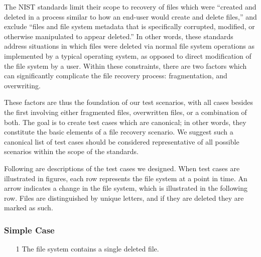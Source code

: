 The NIST standards limit their scope to recovery of files which were ``created and deleted in a process similar to how an end-user would create and delete files,''\cite{meta:dfr:standards} and exclude ``files and file system metadata that is specifically corrupted, modified, or otherwise manipulated to appear deleted.''\cite{meta:dfr:standards}
In other words, these standards address situations in which files were deleted via normal file system operations as implemented by a typical operating system, as opposed to direct modification of the file system by a user.
Within these constraints, there are two factors which can significantly complicate the file recovery process: 
fragmentation, and overwriting. 

These factors are thus the foundation of our test scenarios, with all cases besides the first involving either fragmented files, overwritten files, or a combination of both. 
The goal is to create test cases which are canonical; in other words, they constitute the basic elements of a file recovery scenario.
We suggest such a canonical list of test cases should be considered representative of all possible scenarios within the scope of the standards.

Following are descriptions of the test cases we designed. When test cases are illustrated in figures, each row represents the file system at a point in time. An arrow indicates a change in the file system, which is illustrated in the following row. Files are distinguished by unique letters, and if they are deleted they are marked as such.
\subsubsection{Simple Case}
\begin{itemize}
    \item [1] The file system contains a single deleted file.
\end{itemize}
